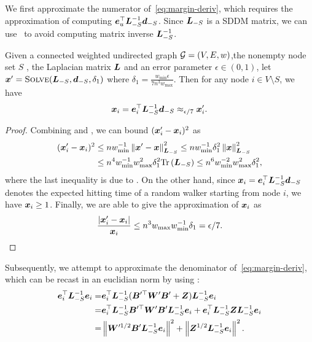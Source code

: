 \documentclass[sigconf]{acmart}
\begin{document}
We first approximate the numerator of~\eqref{eq:margin-deriv}, which requires the approximation of computing \(\boldsymbol{e}_u^\top\boldsymbol{L}_{-S}^{-1}\boldsymbol{d}_{-S}\).
Since \(\boldsymbol{L}_{-S}\) is a SDDM matrix, we can use~ to avoid computing matrix inverse \(\boldsymbol{L}_{-S}^{-1}\).
\begin{lemma}\label{lem:approx-numer}
    Given a connected weighted undirected graph \(\mathcal{G}=(V,E,w)\),the nonempty node set \(S\) , the Laplacian matrix \(\boldsymbol{L}\) and an error parameter \(\epsilon\in(0,1)\), let \(\boldsymbol{x}'=\textsc{Solve}(\boldsymbol{L}_{-S},\boldsymbol{d}_{-S},\delta_1)\) where \(\delta_1=\frac{w_{\min}\epsilon}{7n^3w_{\max}}\). Then for any node \(i\in V\setminus S\), we have
    \begin{equation}\label{eq:approx-numer}
        \boldsymbol{x}_i=\boldsymbol{e}_i^\top\boldsymbol{L}_{-S}^{-1}\boldsymbol{d}_{-S}\approx_{\epsilon/7}\boldsymbol{x}'_i.
    \end{equation}
\end{lemma}
\begin{proof}

    Combining  and , we can bound \((\boldsymbol{x}'_i-\boldsymbol{x}_i)^2\) as
    \begin{align*}
        (\boldsymbol{x}'_i-\boldsymbol{x}_i)^2
         & \le nw_{\min}^{-1}\left\Vert\boldsymbol{x}'-\boldsymbol{x}\right\Vert^2_{\boldsymbol{L}_{-S}}
        \le nw_{\min}^{-1}\delta_1^2\left\Vert\boldsymbol{x}\right\Vert^2_{\boldsymbol{L}_{-S}}        \\
         & \le n^4w_{\min}^{-1}w_{\max}^2\delta_1^2\mathrm{Tr}\left(\boldsymbol{L}_{-S}\right)
        \le n^6w_{\min}^{-2}w_{\max}^2\delta_1^2,
    \end{align*}
    where the last inequality is due to .
    On the other hand, since \(\boldsymbol{x}_i=\boldsymbol{e}_i^\top\boldsymbol{L}_{-S}^{-1}\boldsymbol{d}_{-S}\) denotes the expected hitting time of a random walker starting from node \(i\), we have \(\boldsymbol{x}_i\ge1\).
    Finally, we are able to give the approximation of \(\boldsymbol{x}_i\) as
    \[\frac{\left|\boldsymbol{x}'_i-\boldsymbol{x}_i \right|}{\boldsymbol{x}_i}\le n^3w_{\max}w_{\min}^{-1}\delta_1=\epsilon/7.\]
\end{proof}

Subsequently, we attempt to approximate the denominator of~\eqref{eq:margin-deriv}, which can be recast in an euclidian norm by using :
\begin{equation}\label{eq:denom-solver}
    \begin{split}
        \boldsymbol{e}_i^\top\boldsymbol{L}_{-S}^{-1}\boldsymbol{e}_i
        =&\boldsymbol{e}_i^\top\boldsymbol{L}_{-S}^{-1}(\boldsymbol{B}'^\top\boldsymbol{W}'\boldsymbol{B}'+\boldsymbol{Z})\boldsymbol{L}_{-S}^{-1}\boldsymbol{e}_i\\
        =&\boldsymbol{e}_i^\top\boldsymbol{L}_{-S}^{-1}\boldsymbol{B}'^\top\boldsymbol{W}'\boldsymbol{B}'\boldsymbol{L}_{-S}^{-1}\boldsymbol{e}_i+\boldsymbol{e}_i^\top\boldsymbol{L}_{-S}^{-1}\boldsymbol{Z}\boldsymbol{L}_{-S}^{-1}\boldsymbol{e}_i\\
        =&\left\Vert\boldsymbol{W}'^{1/2}\boldsymbol{B}'\boldsymbol{L}_{-S}^{-1}\boldsymbol{e}_i\right\Vert^2+\left\Vert\boldsymbol{Z}^{1/2}\boldsymbol{L}_{-S}^{-1}\boldsymbol{e}_i\right\Vert^2.
    \end{split}
\end{equation}
\end{document}
